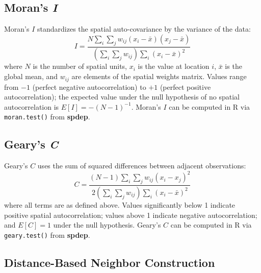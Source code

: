 \documentclass{article}[11pt]
\begin{document}
\subsection*{Moran's \textit{I}}

Moran's $\textit{I}$ standardizes the spatial auto-covariance by the variance of the data:
\begin{equation}
    \textit{I} = \frac{N \displaystyle\sum_{i}\sum_{j} w_{ij}(x_i - \bar{x})(x_j - \bar{x})}
                       {\left(\displaystyle\sum_{i}\sum_{j} w_{ij}\right)\displaystyle\sum_{i}(x_i - \bar{x})^2}
\end{equation}
where $N$ is the number of spatial units, $x_i$ is the value at location $i$, $\bar{x}$ is the global mean, and $w_{ij}$ are elements of the spatial weights matrix. Values range from $-1$ (perfect negative autocorrelation) to $+1$ (perfect positive autocorrelation); the expected value under the null hypothesis of no spatial autocorrelation is $E[\textit{I}] = -(N-1)^{-1}$. Moran's $\textit{I}$ can be computed in R via \texttt{moran.test()} from \textbf{spdep}\cite{bivand_comparing_2018}.

\subsection*{Geary's \textit{C}}

Geary's $\textit{C}$ uses the sum of squared differences between adjacent observations:
\begin{equation}
    \textit{C} = \frac{(N-1)\displaystyle\sum_{i}\sum_{j} w_{ij}(x_i - x_j)^2}
                       {2\left(\displaystyle\sum_{i}\sum_{j} w_{ij}\right)\displaystyle\sum_{i}(x_i - \bar{x})^2}
\end{equation}
where all terms are as defined above. Values significantly below 1 indicate positive spatial autocorrelation; values above 1 indicate negative autocorrelation; and $E[\textit{C}] = 1$ under the null hypothesis. Geary's $\textit{C}$ can be computed in R via \texttt{geary.test()} from \textbf{spdep}\cite{bivand_comparing_2018}.

\subsection*{Distance-Based Neighbor Construction}\label{appendix:DistanceBased}
\end{document}
